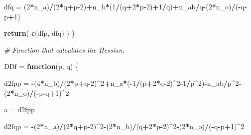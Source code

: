 \documentclass[]{article}
\newenvironment{Shaded}{\begin{snugshade}}{\end{snugshade}}
\newcommand{\KeywordTok}[1]{\textcolor[rgb]{0.13,0.29,0.53}{\textbf{#1}}}
\newcommand{\DecValTok}[1]{\textcolor[rgb]{0.00,0.00,0.81}{#1}}
\newcommand{\StringTok}[1]{\textcolor[rgb]{0.31,0.60,0.02}{#1}}
\newcommand{\CommentTok}[1]{\textcolor[rgb]{0.56,0.35,0.01}{\textit{#1}}}
\newcommand{\ControlFlowTok}[1]{\textcolor[rgb]{0.13,0.29,0.53}{\textbf{#1}}}
\newcommand{\OperatorTok}[1]{\textcolor[rgb]{0.81,0.36,0.00}{\textbf{#1}}}
\newcommand{\NormalTok}[1]{#1}
\begin{document}
\begin{Shaded}
\begin{Highlighting}[]
\NormalTok{  dfq =}\StringTok{ }\NormalTok{(}\DecValTok{2}\OperatorTok{*}\NormalTok{n_a)}\OperatorTok{/}\NormalTok{(}\DecValTok{2}\OperatorTok{*}\NormalTok{q}\OperatorTok{+}\NormalTok{p}\OperatorTok{-}\DecValTok{2}\NormalTok{)}\OperatorTok{+}\NormalTok{n_b}\OperatorTok{*}\NormalTok{(}\DecValTok{1}\OperatorTok{/}\NormalTok{(q}\OperatorTok{+}\DecValTok{2}\OperatorTok{*}\NormalTok{p}\OperatorTok{-}\DecValTok{2}\NormalTok{)}\OperatorTok{+}\DecValTok{1}\OperatorTok{/}\NormalTok{q)}\OperatorTok{+}\NormalTok{n_ab}\OperatorTok{/}\NormalTok{q}\OperatorTok{-}\NormalTok{(}\DecValTok{2}\OperatorTok{*}\NormalTok{n_o)}\OperatorTok{/}\NormalTok{(}\OperatorTok{-}\NormalTok{q}\OperatorTok{-}\NormalTok{p}\OperatorTok{+}\DecValTok{1}\NormalTok{)}
  
  \KeywordTok{return}\NormalTok{( }\KeywordTok{c}\NormalTok{(dfp, dfq) )}
\NormalTok{\}}



\CommentTok{# Function that calculates the Hessian.}

\NormalTok{DDf =}\StringTok{ }\ControlFlowTok{function}\NormalTok{(p, q) \{}
  
      
\NormalTok{    d2fpp =}\StringTok{ }\OperatorTok{-}\NormalTok{(}\DecValTok{4}\OperatorTok{*}\NormalTok{n_b)}\OperatorTok{/}\NormalTok{(}\DecValTok{2}\OperatorTok{*}\NormalTok{p}\OperatorTok{+}\NormalTok{q}\OperatorTok{-}\DecValTok{2}\NormalTok{)}\OperatorTok{^}\DecValTok{2}\OperatorTok{+}\NormalTok{n_a}\OperatorTok{*}\NormalTok{(}\OperatorTok{-}\DecValTok{1}\OperatorTok{/}\NormalTok{(p}\OperatorTok{+}\DecValTok{2}\OperatorTok{*}\NormalTok{q}\OperatorTok{-}\DecValTok{2}\NormalTok{)}\OperatorTok{^}\DecValTok{2}\OperatorTok{-}\DecValTok{1}\OperatorTok{/}\NormalTok{p}\OperatorTok{^}\DecValTok{2}\NormalTok{)}\OperatorTok{-}\NormalTok{n_ab}\OperatorTok{/}\NormalTok{p}\OperatorTok{^}\DecValTok{2}\OperatorTok{-}\NormalTok{(}\DecValTok{2}\OperatorTok{*}\NormalTok{n_o)}\OperatorTok{/}\NormalTok{(}\OperatorTok{-}\NormalTok{p}\OperatorTok{-}\NormalTok{q}\OperatorTok{+}\DecValTok{1}\NormalTok{)}\OperatorTok{^}\DecValTok{2}
    
\NormalTok{    a =}\StringTok{ }\NormalTok{d2fpp}
    
    
\NormalTok{    d2fqp =}\StringTok{ }\OperatorTok{-}\NormalTok{(}\DecValTok{2}\OperatorTok{*}\NormalTok{n_a)}\OperatorTok{/}\NormalTok{(}\DecValTok{2}\OperatorTok{*}\NormalTok{q}\OperatorTok{+}\NormalTok{p}\OperatorTok{-}\DecValTok{2}\NormalTok{)}\OperatorTok{^}\DecValTok{2}\OperatorTok{-}\NormalTok{(}\DecValTok{2}\OperatorTok{*}\NormalTok{n_b)}\OperatorTok{/}\NormalTok{(q}\OperatorTok{+}\DecValTok{2}\OperatorTok{*}\NormalTok{p}\OperatorTok{-}\DecValTok{2}\NormalTok{)}\OperatorTok{^}\DecValTok{2}\OperatorTok{-}\NormalTok{(}\DecValTok{2}\OperatorTok{*}\NormalTok{n_o)}\OperatorTok{/}\NormalTok{(}\OperatorTok{-}\NormalTok{q}\OperatorTok{-}\NormalTok{p}\OperatorTok{+}\DecValTok{1}\NormalTok{)}\OperatorTok{^}\DecValTok{2}
    

\end{Highlighting}
\end{Shaded}
\end{document}
